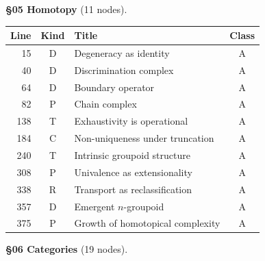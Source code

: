 \medskip
\noindent\textbf{\S05 Homotopy} (11 nodes).

\begin{center}
\scriptsize
\begin{tabular}{r|c|l|c}
\textbf{Line} & \textbf{Kind} & \textbf{Title} & \textbf{Class} \\
\hline
15 & \textsf{D} & Degeneracy as identity & A \\
40 & \textsf{D} & Discrimination complex & A \\
64 & \textsf{D} & Boundary operator & A \\
82 & \textsf{P} & Chain complex & A \\
138 & \textsf{T} & Exhaustivity is operational & A \\
184 & \textsf{C} & Non-uniqueness under truncation & A \\
240 & \textsf{T} & Intrinsic groupoid structure & A \\
308 & \textsf{P} & Univalence as extensionality & A \\
338 & \textsf{R} & Transport as reclassification & A \\
357 & \textsf{D} & Emergent $n$-groupoid & A \\
375 & \textsf{P} & Growth of homotopical complexity & A \\
\end{tabular}
\end{center}

\medskip
\noindent\textbf{\S06 Categories} (19 nodes).

